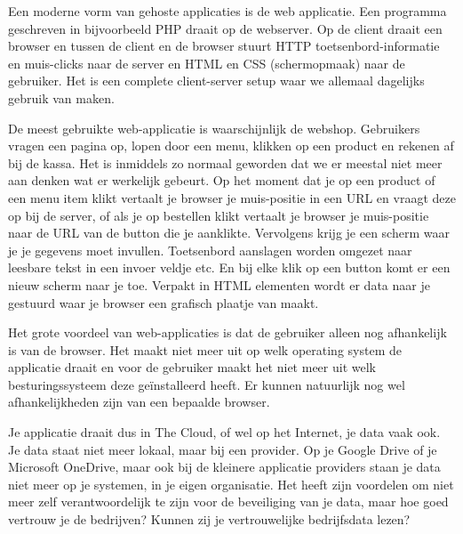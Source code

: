 Een moderne vorm van gehoste applicaties is de web applicatie. Een programma geschreven in bijvoorbeeld PHP draait op de webserver. Op de client draait een browser en tussen de client en de browser stuurt HTTP toetsenbord-informatie  en muis-clicks naar de server en HTML en CSS (schermopmaak) naar de gebruiker. Het is een complete client-server setup waar we allemaal dagelijks gebruik van maken.

De meest gebruikte web-applicatie is waarschijnlijk de webshop. Gebruikers vragen een pagina op, lopen door een menu, klikken op een product en rekenen af bij de kassa. Het is inmiddels zo normaal geworden dat we er meestal niet meer aan denken wat er werkelijk gebeurt. Op het moment dat je op een product of een menu item klikt vertaalt je browser je muis-positie in een URL en vraagt deze op bij de server, of als je op bestellen klikt vertaalt je browser je muis-positie naar de URL van de button die je aanklikte. Vervolgens krijg je een scherm waar je je gegevens moet invullen. Toetsenbord aanslagen worden omgezet naar leesbare tekst in een invoer veldje etc. En bij elke klik op een button komt er een nieuw scherm naar je toe. Verpakt in HTML elementen wordt er data naar je gestuurd waar je browser een grafisch plaatje van maakt.

Het grote voordeel van web-applicaties is dat de gebruiker alleen nog afhankelijk is van de browser. Het maakt niet meer uit op welk operating system de applicatie draait en voor de gebruiker maakt het niet meer uit welk besturingssysteem deze ge\"installeerd heeft. Er kunnen natuurlijk nog wel afhankelijkheden zijn van een bepaalde browser.

Je applicatie draait dus in The Cloud, of wel op het Internet, je data vaak ook. Je data staat niet meer lokaal, maar bij een provider. Op je Google Drive of je Microsoft OneDrive, maar ook bij de kleinere applicatie providers staan je data niet meer op je systemen, in je eigen organisatie. Het heeft zijn voordelen om niet meer zelf verantwoordelijk te zijn voor de beveiliging van je data, maar hoe goed vertrouw je de bedrijven? Kunnen zij je vertrouwelijke bedrijfsdata lezen?

